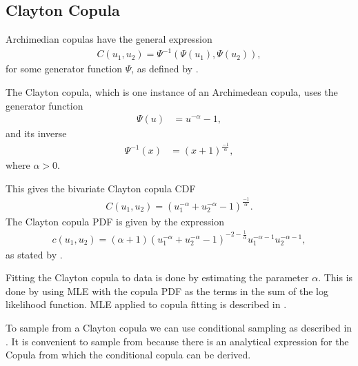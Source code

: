 \documentclass[%
a4paper,							
11pt,								
bibliography=totoc,						
abstracton=true					
]
{scrartcl}
\theoremstyle{plain}
\theoremstyle{definition}
\theoremstyle{remark}
\newcommand{\1}{\mathbbm{1}}
\begin{document}
\subsection{Clayton Copula}\label{sec:ClaytonCopula}
Archimedian copulas have the general expression  
\begin{align*}
    C(u_1,u_2) = \Psi^{-1}(\Psi(u_1),\Psi(u_2)),
\end{align*}
for some generator function $\Psi$, as defined by .

The Clayton copula, which is one instance of an Archimedean copula, uses the generator function
\begin{align*}
    \Psi(u) &=u^{-\alpha}-1, 
\end{align*}
and its inverse
\begin{align*}
    \Psi^{-1}(x) &= (x+1)^{\frac{-1}{\alpha}},
\end{align*}
where $\alpha > 0$. 

This gives the bivariate Clayton copula \gls{CDF}
\begin{align*}
    C(u_1,u_2) = (u_1^{-\alpha} + u_2^{-\alpha}-1)^{\frac{-1}{\alpha}}.
\end{align*}
The Clayton copula \gls{PDF} is given by the expression
\begin{align*}
    c(u_1,u_2) = (\alpha+1)(u_1^{-\alpha}+u_2^{-\alpha}-1)^{-2- \frac{1}{\alpha}}u_1^{-\alpha -1} u_2^{-\alpha -1},
\end{align*}
as stated by . 

Fitting the Clayton copula to data is done by estimating the parameter $\alpha$. This is done by using \gls{MLE} with the copula \gls{PDF} as the terms in the sum of the log likelihood function. \gls{MLE} applied to copula fitting is described in . 

To sample from a Clayton copula we can use conditional sampling as described in . It is convenient to sample from because there is an analytical expression for the Copula from which the conditional copula can be derived. 


\newpage
\end{document}
